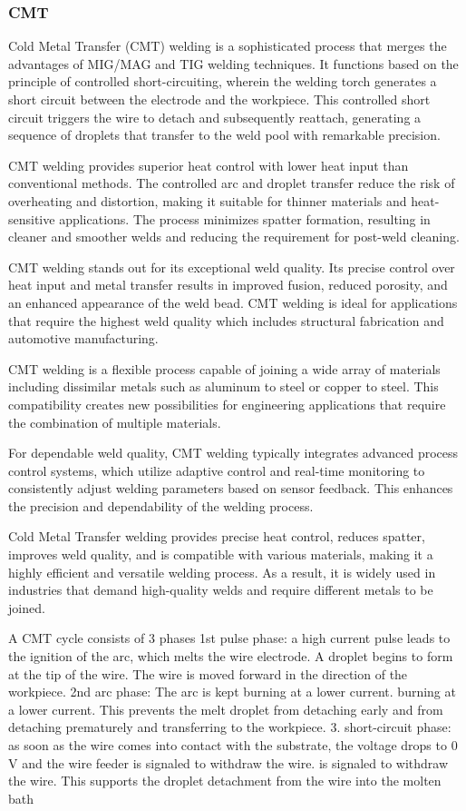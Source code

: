 \subsubsection{CMT}
Cold Metal Transfer (CMT) welding is a sophisticated process that merges the advantages of MIG/MAG and TIG welding techniques. It functions based on the principle of controlled short-circuiting, wherein the welding torch generates a short circuit between the electrode and the workpiece. This controlled short circuit triggers the wire to detach and subsequently reattach, generating a sequence of droplets that transfer to the weld pool with remarkable precision.

CMT welding provides superior heat control with lower heat input than conventional methods. The controlled arc and droplet transfer reduce the risk of overheating and distortion, making it suitable for thinner materials and heat-sensitive applications. The process minimizes spatter formation, resulting in cleaner and smoother welds and reducing the requirement for post-weld cleaning.

CMT welding stands out for its exceptional weld quality. Its precise control over heat input and metal transfer results in improved fusion, reduced porosity, and an enhanced appearance of the weld bead. CMT welding is ideal for applications that require the highest weld quality which includes structural fabrication and automotive manufacturing.

CMT welding is a flexible process capable of joining a wide array of materials including dissimilar metals such as aluminum to steel or copper to steel. This compatibility creates new possibilities for engineering applications that require the combination of multiple materials.

For dependable weld quality, CMT welding typically integrates advanced process control systems, which utilize adaptive control and real-time monitoring to consistently adjust welding parameters based on sensor feedback. This enhances the precision and dependability of the welding process.

Cold Metal Transfer welding provides precise heat control, reduces spatter, improves weld quality, and is compatible with various materials, making it a highly efficient and versatile welding process. As a result, it is widely used in industries that demand high-quality welds and require different metals to be joined.

A CMT cycle consists of 3 phases 
1st pulse phase: a high current pulse leads to the ignition of the arc, 
which melts the wire electrode. A droplet begins to form at the 
tip of the wire. The wire is moved forward in the direction of the 
workpiece.
2nd arc phase: The arc is kept burning at a lower current. 
burning at a lower current. This prevents the melt droplet from detaching early and 
from detaching prematurely and transferring to the workpiece.
3. short-circuit phase: as soon as the wire comes into contact with the substrate, 
the voltage drops to 0 V and the wire feeder is signaled to withdraw the wire. 
is signaled to withdraw the wire. This supports the droplet detachment 
from the wire into the molten bath 

